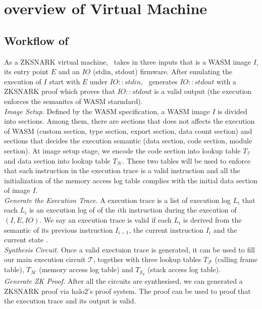 \section{overview of \zkwasm Virtual Machine}
\subsection{Workflow of \zkwasm}
As a ZKSNARK virtual machine, \zkwasm\, takes in three inputs that is a WASM image $I$, its entry point $E$ and an $IO$ (stdin, stdout) firmware. After emulating the execution of $I$ start with $E$ under $IO::stdin$, \zkwasm\, generates $IO::stdout$ with a ZKSNARK proof which proves that $IO::stdout$ is a valid output (the execution enforces the semanitcs of WASM starndard).\\

\noindent\emph{Image Setup.}
Defined by the WASM specification, a WASM image $I$ is divided into sections. Among them, there are sections that does not affects the execution of WASM (custom section, type section, export section, data count section) and sections that decides the execution semantic (data section, code section, module section). At image setup stage, we encode the code section into lookup table $T_\mathcal{I}$ and data section into lookup table $T_\mathcal{H}$. These two tables will be used to enforce that each instruction in the execution trace is a valid instruction and all the initialization of the memory access log table complies with the initial data section of image $I$.\\

\noindent\emph{Generate the Execution Trace.}
A execution trace is a list of execution log $L_i$ that each $L_i$ is an execution log of of the $i$th instruction during the execution of $(I, E, IO)$. We say an execution trace is valid if each $L_i$ is derived from the semantic of its previous instruction $I_{i-1}$, the current instruction $I_{i}$ and the current state \fullstate.\\

\noindent\emph{Synthesis Circuit.}
Once a valid exectuion trace is generated, it can be used to fill our main execution circuit $\mathcal{T}$, together with three lookup tables $T_\mathcal{F}$ (calling frame table), $T_\mathcal{M}$ (memory access log table) and $T_{\mathcal{S}_p}$ (stack access log table). \\

\noindent\emph{Generate ZK Proof.}
After all the circuits are synthesised, we can generated a ZKSNARK proof via halo2's proof system. The proof can be used to proof that the execution trace and its output is valid.

